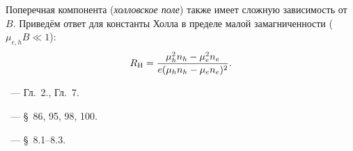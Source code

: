 \begin{lab:example}
Поперечная компонента (\emph{холловское поле}) также имеет сложную
зависимость от~$B$. Приведём ответ для константы Холла
в пределе малой замагниченности ($\mu_{e,h} B \ll 1$):
\begin{equation}
    \eqmark{3.21}
    R_{\rm H} = \frac{\mu_h^2 n_h - \mu_e^2 n_e}%
{e(\mu_hn_h-\mu_en_e)^2}.
\end{equation}
\end{lab:example}


\begin{lab:literature}
    \item \Kirichenko~--- Гл.~2., Гл.~7.
    \item \SivuhinIII~--- \S~86, 95, 98, 100.
    \item \KingLokOlh~--- \S~8.1--8.3.
\end{lab:literature}

